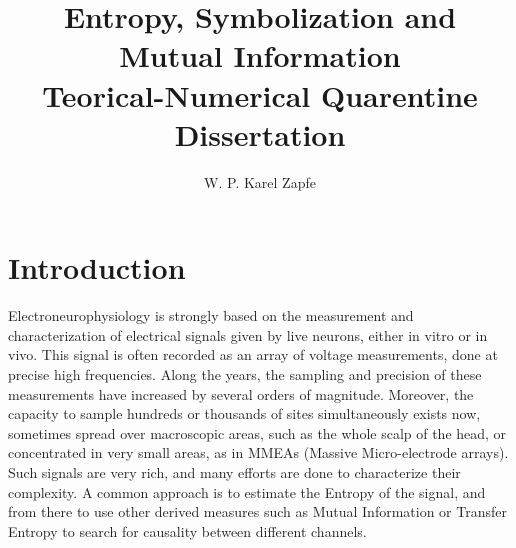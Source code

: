 \documentclass[10pt]{article}
\title{Entropy, Symbolization and Mutual Information \\
Teorical-Numerical Quarentine Dissertation}
\author{ W. P. Karel Zapfe}
\begin{document}
\maketitle

\section{Introduction}

Electroneurophysiology is strongly based on the measurement and characterization of electrical signals given by live neurons, either in vitro or in vivo. This signal is often recorded as an array of voltage measurements, done at precise high frequencies. Along the years, the sampling and precision of these measurements have increased by several orders of magnitude. Moreover, the capacity to sample hundreds or thousands of sites simultaneously exists now, sometimes spread over macroscopic areas, such as the whole scalp of the head, or concentrated in very small areas, as in MMEAs (Massive Micro-electrode arrays). Such signals are very rich, and many efforts are done to characterize their complexity. A common approach is to estimate the Entropy of the signal, and from there to use other derived measures such as Mutual Information or Transfer Entropy to search for causality between different channels.
\end{document}

